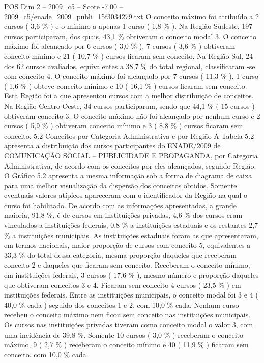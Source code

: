 \begin{textsample}{POS Dim 2 – 2009\_c5 – Score -7.00 – 2009\_c5/enade\_2009\_publi\_15f3034279.txt}
O conceito máximo foi atribuído a 2 cursos ( 3,6 \% ) e o mínimo a apenas 1 curso ( 1,8 \% ).
Na Região Sudeste, 197 cursos participaram, dos quais, 43,1 \% obtiveram o conceito modal 3.
O conceito máximo foi alcançado por 6 cursos ( 3,0 \% ), 7 cursos ( 3,6 \% ) obtiveram conceito mínimo e 21 ( 10,7 \% ) cursos ficaram sem conceito.
Na Região Sul, 24 dos 62 cursos avaliados, equivalentes a 38,7 \% do total regional, classificaram -se com conceito 4.
O conceito máximo foi alcançado por 7 cursos ( 11,3 \% ), 1 curso ( 1,6 \% ) obteve conceito mínimo e 10 ( 16,1 \% ) cursos ficaram sem conceito.
Esta Região foi a que apresentou cursos com a melhor distribuição de conceitos.
Na Região Centro-Oeste, 34 cursos participaram, sendo que 44,1 \% ( 15 cursos ) obtiveram conceito 3.
O conceito máximo não foi alcançado por nenhum curso e 2 cursos ( 5,9 \% ) obtiveram conceito mínimo e 3 ( 8,8 \% ) cursos ficaram sem conceito. 5.2 Conceitos por Categoria Administrativa e por Região A Tabela 5.2 apresenta a distribuição dos cursos participantes do ENADE/2009 de COMUNICAÇÃO SOCIAL – PUBLICIDADE E PROPAGANDA, por Categoria Administrativa, de acordo com os conceitos por eles alcançados, segundo Região.
O Gráfico 5.2 apresenta a mesma informação sob a forma de diagrama de caixa para uma melhor visualização da dispersão dos conceitos obtidos.
Somente eventuais valores atípicos apareceram com o identificador da Região na qual o curso foi habilitado.
De acordo com as informações apresentadas, a grande maioria, 91,8 \%, é de cursos em instituições privadas, 4,6 \% dos cursos eram vinculados a instituições federais, 0,8 \% a instituições estaduais e os restantes 2,7 \% a instituições municipais.
As instituições estaduais foram as que apresentaram, em termos nacionais, maior proporção de cursos com conceito 5, equivalentes a 33,3 \% do total dessa categoria, mesma proporção daqueles que receberam conceito 2 e daqueles que ficaram sem conceito.
Receberam o conceito mínimo, em instituições federais, 3 cursos ( 17,6 \% ), mesmo número e proporção daqueles que obtiveram conceitos 3 e 4.
Ficaram sem conceito 4 cursos ( 23,5 \% ) em instituições federais.
Entre as instituições municipais, o conceito modal foi 3 e 4 ( 40,0 \% cada ) seguido dos conceitos 1 e 2, com 10,0 \% cada.
Nenhum curso recebeu o conceito máximo nem ficou sem conceito nas instituições municipais.
Os cursos nas instituições privadas tiveram como conceito modal o valor 3, com uma incidência de 39,8 \%.
Somente 10 cursos ( 3,0 \% ) receberam o conceito máximo, 9 ( 2,7 \% ) receberam o conceito mínimo e 40 ( 11,9 \% ) ficaram sem conceito. com 10,0 \% cada.

\end{textsample}
